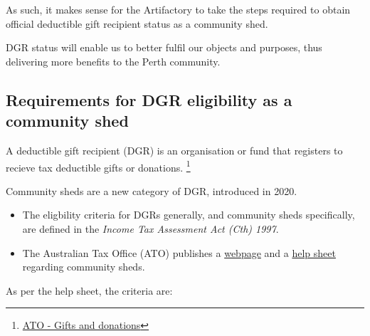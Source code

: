\documentclass[../constitution.tex]{subfiles}
\begin{document}
As such, it makes sense for the Artifactory to take the steps required to obtain official deductible gift recipient status as a community shed.

DGR status will enable us to better fulfil our objects and purposes, thus delivering more benefits to the Perth community.

\subsection*{Requirements for DGR eligibility as a community shed}

A deductible gift recipient (DGR) is an organisation or fund that registers to recieve tax deductible gifts or donations. \footnote{\href{https://www.ato.gov.au/individuals/income-and-deductions/deductions-you-can-claim/other-deductions/gifts-and-donations/}{ATO - Gifts and donations}}

\bigskip

Community sheds are a new category of DGR, introduced in 2020.

\begin{itemize}
    \item The eligbility criteria for DGRs generally, and community sheds specifically, are defined in the \textit{Income Tax Assessment Act (Cth) 1997}.
    \item The Australian Tax Office (ATO) publishes a \href{https://www.ato.gov.au/Non-profit/Getting-started/In-detail/Types-of-DGRs/Community-sheds/?=redirected_communitysheds}{webpage} and a \href{https://cdn2.app.viostream.com/3da28d19-5792-4397-b158-a4740090a8d8/d1a1ccce-1c54-45f0-9f7e-9a8f63d2d05b/d74a313a-96c3-418e-9390-ac4600afbf00.pdf?response-content-disposition=attachment%3bfilename%3d2020+Help+Sheet+_+Community+Sheds+_+Meeting+DGR+endorsement+_20200921.pdf}{help sheet} regarding community sheds.
\end{itemize}

\bigskip

As per the help sheet, the criteria are:
\end{document}
